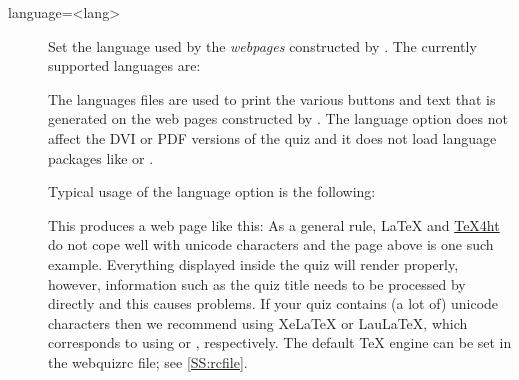 \documentclass[svgnames]{article}
\newcommand\TeXfht{\href{https://www.ctan.org/tex4ht}{TeX4ht}\xspace}
\newcommand\webquizrc{\index{webquizrc}\textsf{webquizrc}\xspace}
\begin{document}
\begin{description}
  \item[language=<lang>] 
  Set the language used by the \textit{webpages} constructed by \WebQuiz.
  The currently supported languages are:

    \begin{quote}
        
    \end{quote}

    The languages files are used to print the various buttons and text
    that is generated on the web pages constructed by \WebQuiz. The
    \textsf{language} option does not affect the DVI or PDF versions of
    the quiz and it does not load language packages like  or
    .

    Typical usage of the \textsf{language} option is the following:
    
    This produces a web page like this:
    As a general rule, \LaTeX{} and \TeXfht do not cope well with
    unicode characters and the page above is one such example.
    Everything displayed inside the quiz will render properly, however,
    information such as the quiz title needs to be processed by
     directly and this causes problems. If your quiz
    contains (a lot of) unicode characters then we recommend using
    Xe\LaTeX{} or Lau\LaTeX, which corresponds to using
     or , respectively. The
    default \TeX{} engine can be set in the \webquizrc file; see
    \autoref{SS:rcfile}.


\end{description}
\end{document}
